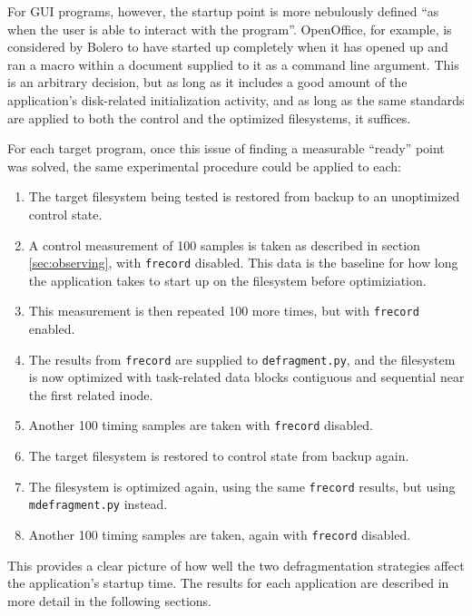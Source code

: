 \documentclass[10pt,twocolumn,letterpaper]{article}
\begin{document}
For GUI programs, however, the startup point is more nebulously defined ``as when the user is
able to interact with the program''. OpenOffice, for example, is considered by Bolero to have started up completely when it has opened up and ran a macro within a document supplied to it as a command line argument. This is an arbitrary decision, but as long as it includes a good amount of the application's disk-related initialization activity, and as long as the same standards are applied to both the control and the optimized filesystems,
it suffices.

For each target program, once this issue of finding a measurable ``ready'' point was solved,
the same experimental procedure could be applied to each:

\begin{enumerate}
\item The target filesystem being tested is restored from backup to an unoptimized control state.
\item A control measurement of 100 samples is taken as described in section \ref{sec:observing}, with \texttt{frecord} disabled. This data is the baseline for how long the application takes to start up
on the filesystem before optimiziation.
\item This measurement is then repeated 100 more times, but with \texttt{frecord} enabled.
\item The results from \texttt{frecord} are supplied to \texttt{defragment.py}, and the filesystem is now optimized with task-related data blocks contiguous and sequential near the first related inode.
\item Another 100 timing samples are taken with \texttt{frecord} disabled.
\item The target filesystem is restored to control state from backup again.
\item The filesystem is optimized again, using the same \texttt{frecord} results, but using \texttt{mdefragment.py} instead.
\item Another 100 timing samples are taken, again with \texttt{frecord} disabled.
\end{enumerate}

This provides a clear picture of how well the two defragmentation strategies affect the application's startup time. The results for each application are described in more detail in the following sections.
\end{document}
